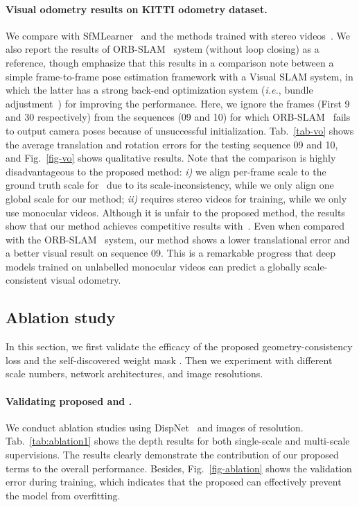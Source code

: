 \documentclass{article}
\newcommand{\figref}[1]{Fig.~\ref{#1}}
\newcommand{\tabref}[1]{Tab.~\ref{#1}}
\def\ie{\emph{i.e.}}
\begin{document}
\paragraph{Visual odometry results on KITTI odometry dataset.}
We compare with SfMLearner~\cite{zhou2017unsupervised} and the methods trained with stereo videos~\cite{zhan2018unsupervised}.
We also report the results of ORB-SLAM~\cite{mur2015orb} system (without loop closing) as a reference, though emphasize that this results in a comparison note between a simple frame-to-frame pose estimation framework with a Visual SLAM system, in which the latter has a strong back-end optimization system (\ie, bundle adjustment~\cite{triggs1999bundle}) for improving the performance.
Here, we ignore the frames (First 9 and 30 respectively) from the sequences (09 and 10) for which ORB-SLAM~\cite{mur2015orb} fails to output camera poses because of unsuccessful initialization.
\tabref{tab-vo} shows the average translation and rotation errors for the testing sequence 09 and 10, and \figref{fig-vo} shows qualitative results.
Note that the comparison is highly disadvantageous to the proposed method: 
\emph{i)} we align per-frame scale to the ground truth scale for~\cite{zhou2017unsupervised} due to its scale-inconsistency, while we only align one global scale for our method;
\emph{ii)} \cite{zhan2018unsupervised} requires stereo videos for training, while we only use monocular videos.
Although it is unfair to the proposed method, the results show that our method achieves competitive results with~\cite{zhan2018unsupervised}.
Even when compared with the ORB-SLAM~\cite{mur2015orb} system, our method shows a lower translational error and a better visual result on sequence 09. 
This is a remarkable progress that deep models trained on unlabelled monocular videos can predict a globally scale-consistent visual odometry.



\subsection{Ablation study}\label{sec-ablation}

In this section, we first validate the efficacy of the proposed geometry-consistency loss  and the self-discovered weight mask .
Then we experiment with different scale numbers, network architectures, and image resolutions.

\paragraph{Validating proposed  and .}
We conduct ablation studies using DispNet~\cite{zhou2017unsupervised} and images of  resolution.
\tabref{tab:ablation1} shows the depth results for both single-scale and multi-scale supervisions.
The results clearly demonstrate the contribution of our proposed terms to the overall performance.
Besides, \figref{fig-ablation} shows the validation error during training, which indicates that the proposed  can effectively prevent the model from overfitting.
\end{document}
